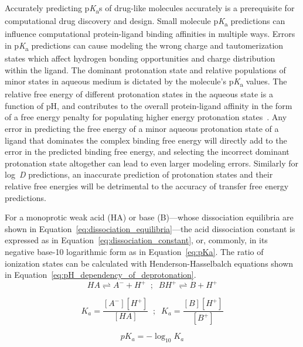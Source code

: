 \documentclass[9pt,lineno,final]{elife}
\newcommand{\pKa}{p\textit{K}\textsubscript{a}}
\newcommand{\logD}{log~\textit{D}}
\begin{document}
Accurately predicting \pKa{}s of drug-like molecules accurately is a prerequisite for computational drug discovery and design.
Small molecule \pKa{} predictions can influence computational protein-ligand binding affinities in multiple ways. 
Errors in \pKa{} predictions can cause modeling the wrong charge and tautomerization states which affect hydrogen bonding opportunities and charge distribution within  the ligand.
The dominant protonation state and relative populations of minor states in aqueous medium is dictated by the molecule's \pKa{} values. 
The relative free energy of different protonation states in the aqueous state is a function of pH, and contributes to the overall protein-ligand affinity in the form of a free energy penalty for populating higher energy protonation states~\citep{deOliveira:2019:J.Chem.TheoryComput.}.
Any error in predicting the free energy of a minor aqueous protonation state of a ligand that dominates the complex binding free energy will directly add to the error in the predicted binding free energy, and selecting the incorrect dominant protonation state altogether can lead to even larger modeling errors. 
Similarly for \logD{} predictions, an inaccurate prediction of protonation states and their relative free energies will be detrimental to the accuracy of transfer free energy predictions.

For a monoprotic weak acid (HA) or base (B)---whose dissociation equilibria are shown in Equation~\ref{eq:dissociation_equilibria}---the acid dissociation constant is expressed as in Equation~\ref{eq:dissociation_constant}, or, commonly, in its negative base-10 logarithmic form as in Equation~\ref{eq:pKa}. 
The ratio of ionization states can be calculated with Henderson-Hasselbalch equations shown in Equation~\ref{eq:pH_dependency_of_deprotonation}. 
\begin{equation}
HA \rightleftharpoons A^- + H^+ \;\; ; \;\; BH^+ \rightleftharpoons B + H^+
\label{eq:dissociation_equilibria}
\end{equation}

\begin{equation}
K_a = \frac{[A^-][H^+]}{[HA]}\;\; ; \;\;K_a = \frac{[B][H^+]}{[B^+]} 
\label{eq:dissociation_constant}
\end{equation}

\begin{equation}
pK_a = -\log_{10}{K_a}
\label{eq:pKa}
\end{equation}
\end{document}
